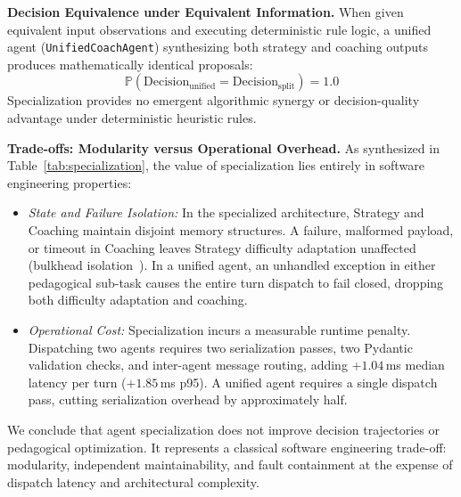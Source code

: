 \noindent\textbf{Decision Equivalence under Equivalent Information.} When given equivalent input observations and executing deterministic rule logic, a unified agent (\texttt{UnifiedCoachAgent}) synthesizing both strategy and coaching outputs produces mathematically identical proposals:
$$\mathbb{P}(\text{Decision}_{\text{unified}} = \text{Decision}_{\text{split}}) = 1.0$$
Specialization provides no emergent algorithmic synergy or decision-quality advantage under deterministic heuristic rules.

\noindent\textbf{Trade-offs: Modularity versus Operational Overhead.} As synthesized in Table~\ref{tab:specialization}, the value of specialization lies entirely in software engineering properties:
\begin{itemize}
\item \emph{State and Failure Isolation:} In the specialized architecture, Strategy and Coaching maintain disjoint memory structures. A failure, malformed payload, or timeout in Coaching leaves Strategy difficulty adaptation unaffected (bulkhead isolation~\cite{nygard}). In a unified agent, an unhandled exception in either pedagogical sub-task causes the entire turn dispatch to fail closed, dropping both difficulty adaptation and coaching.
\item \emph{Operational Cost:} Specialization incurs a measurable runtime penalty. Dispatching two agents requires two serialization passes, two Pydantic validation checks, and inter-agent message routing, adding $+1.04$\,ms median latency per turn ($+1.85$\,ms p95). A unified agent requires a single dispatch pass, cutting serialization overhead by approximately half.
\end{itemize}
We conclude that agent specialization does not improve decision trajectories or pedagogical optimization. It represents a classical software engineering trade-off: modularity, independent maintainability, and fault containment at the expense of dispatch latency and architectural complexity.
